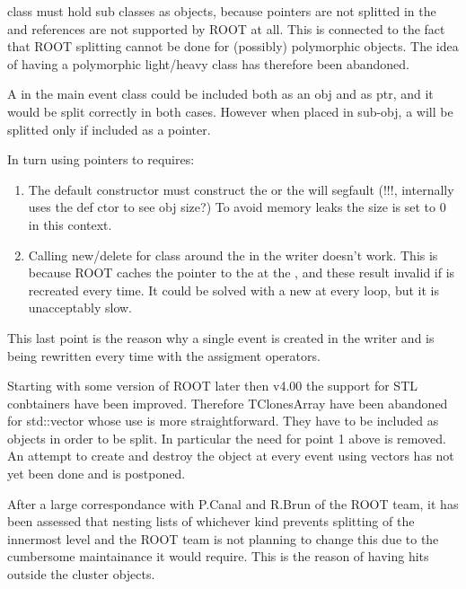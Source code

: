  class must hold sub classes as objects,
because pointers are not splitted in the 
and references are not supported by ROOT at all.
This is connected to the fact that ROOT splitting cannot be done for (possibly) polymorphic objects.
The idea of having a polymorphic light/heavy  class has therefore been abandoned.
 
A  in the main event class could be included both as an obj and as ptr,
and it would be split correctly in both cases.
However when placed in sub-obj, a  will be splitted only if included as a pointer. 

In turn using pointers to  requires:
\begin{enumerate}
\item The default constructor must construct the  
or the  will segfault (!!!, internally uses the def ctor to see obj size?)
To avoid memory leaks the size is set to 0 in this context.

\item Calling new/delete for  class around the  in the writer doesn't work.
This is because ROOT caches the pointer to the  at the , 
and these result invalid if  is recreated every time. 
It could be solved with a new  at every loop, but it is unacceptably slow.
\end{enumerate}

This last point is the reason why a single event is created in the writer and is being rewritten every time with the assigment operators.

Starting with some version of ROOT later then v4.00 the support for STL conbtainers have been improved.
Therefore TClonesArray have been abandoned for std::vector whose use is more straightforward.
They have to be included as objects in order to be split.
In particular the need for point 1 above is removed.
An attempt to create and destroy the object at every event using vectors has not yet been done and is postponed.

After a large correspondance with P.Canal and R.Brun of the ROOT team, 
it has been assessed that nesting lists of whichever kind prevents splitting of the innermost level 
and the ROOT team is not planning to change this due to the cumbersome maintainance it would require.
This is the reason of having hits outside the cluster objects.
